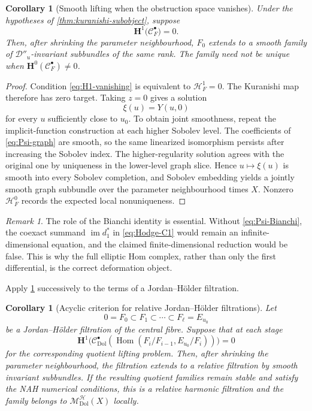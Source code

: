 \documentclass[11pt,reqno]{amsart}
\newtheorem{corollary}[theorem]{Corollary}
\theoremstyle{definition}
\theoremstyle{remark}
\newtheorem{remark}[theorem]{Remark}
\newcommand{\cC}{\mathcal C}
\newcommand{\cD}{\mathcal D}
\newcommand{\cH}{\mathcal H}
\newcommand{\Hom}{\operatorname{Hom}}
\newcommand{\im}{\operatorname{im}}
\newcommand{\Dol}{\mathrm{Dol}}
\newcommand{\MHDol}{\mathscr M^{\cH}_{\Dol}}
\begin{document}
\begin{corollary}[Smooth lifting when the obstruction space vanishes]\label{thm:smooth-lifting-subobject}
Under the hypotheses of \cref{thm:kuranishi-subobject}, suppose
\begin{equation}\label{eq:H1-vanishing}
  \mathbf H^1\bigl(\cC^\bullet_F\bigr)=0.
\end{equation}
Then, after shrinking the parameter neighbourhood, $F_0$ extends to a smooth family of $\cD''_u$-invariant subbundles of the same rank.  The family need not be unique when $\mathbf H^0(\cC^\bullet_F)\ne0$.
\end{corollary}

\begin{proof}
Condition \eqref{eq:H1-vanishing} is equivalent to $\cH^1_F=0$.  The Kuranishi map therefore has zero target.  Taking $z=0$ gives a solution
\[
  \xi(u)=Y(u,0)
\]
for every $u$ sufficiently close to $u_0$.  To obtain joint smoothness, repeat the implicit-function construction at each higher Sobolev level.  The coefficients of \eqref{eq:Psi-graph} are smooth, so the same linearized isomorphism persists after increasing the Sobolev index.  The higher-regularity solution agrees with the original one by uniqueness in the lower-level graph slice.  Hence $u\mapsto\xi(u)$ is smooth into every Sobolev completion, and Sobolev embedding yields a jointly smooth graph subbundle over the parameter neighbourhood times $X$.  Nonzero $\cH^0_F$ records the expected local nonuniqueness.
\end{proof}

\begin{remark}
The role of the Bianchi identity is essential.  Without \eqref{eq:Psi-Bianchi}, the coexact summand $\im d_1^*$ in \eqref{eq:Hodge-C1} would remain an infinite-dimensional equation, and the claimed finite-dimensional reduction would be false.  This is why the full elliptic Hom complex, rather than only the first differential, is the correct deformation object.
\end{remark}


Apply \cref{thm:smooth-lifting-subobject} successively to the terms of a Jordan--H\"older filtration.

\begin{corollary}[Acyclic criterion for relative Jordan--H\"older filtrations]\label{cor:acyclic-JH}
Let
\[
  0=F_0\subset F_1\subset\cdots\subset F_\ell=E_{u_0}
\]
be a Jordan--H\"older filtration of the central fibre.  Suppose that at each stage
\[
  \mathbf H^1\bigl(
  \cC^\bullet_{\Dol}(\Hom(F_i/F_{i-1},E_{u_0}/F_i))
  \bigr)=0
\]
for the corresponding quotient lifting problem.  Then, after shrinking the parameter neighbourhood, the filtration extends to a relative filtration by smooth invariant subbundles.  If the resulting quotient families remain stable and satisfy the NAH numerical conditions, this is a relative harmonic filtration and the family belongs to $\MHDol(X)$ locally.
\end{corollary}
\end{document}
